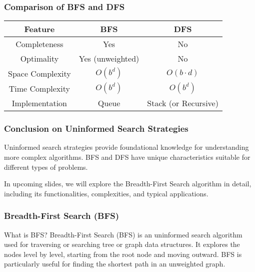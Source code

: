\documentclass[aspectratio=169]{beamer}
\begin{document}
\begin{frame}[fragile]
  \frametitle{Comparison of BFS and DFS}
  \begin{center}
    \begin{tabular}{|c|c|c|}
      \hline
      Feature               & BFS                      & DFS                     \\
      \hline
      Completeness          & Yes                     & No                      \\
      \hline
      Optimality            & Yes (unweighted)       & No                      \\
      \hline
      Space Complexity      & $O(b^d)$                & $O(b \cdot d)$        \\
      \hline
      Time Complexity       & $O(b^d)$                & $O(b^d)$              \\
      \hline
      Implementation        & Queue                   & Stack (or Recursive)    \\
      \hline
    \end{tabular}
  \end{center}
\end{frame}

\begin{frame}[fragile]
  \frametitle{Conclusion on Uninformed Search Strategies}
  Uninformed search strategies provide foundational knowledge for understanding more complex algorithms. BFS and DFS have unique characteristics suitable for different types of problems. 

  In upcoming slides, we will explore the Breadth-First Search algorithm in detail, including its functionalities, complexities, and typical applications.
\end{frame}

\begin{frame}[fragile]
    \frametitle{Breadth-First Search (BFS)}
    \begin{block}{What is BFS?}
        Breadth-First Search (BFS) is an uninformed search algorithm used for traversing or searching tree or graph data structures. It explores the nodes level by level, starting from the root node and moving outward. BFS is particularly useful for finding the shortest path in an unweighted graph.
    \end{block}
\end{frame}
\end{document}
